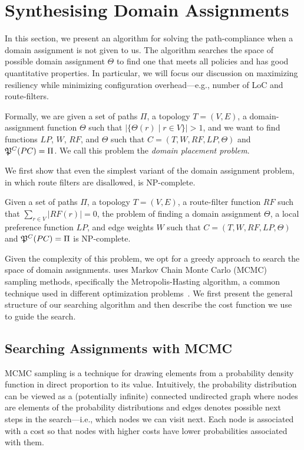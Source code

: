 \section{Synthesising Domain Assignments}
\label{sec:synth-dom-ass}

In this section, we present an algorithm for 
solving the path-compliance when a domain assignment is not given to us.
The algorithm searches the space of possible domain assignment $\Theta$ to find
one that meets all  policies and has good quantitative properties.
In particular, we will focus our discussion on maximizing resiliency while minimizing
configuration overhead---e.g.,  number of LoC and route-filters.

Formally, we are given a set of paths $\Pi$,
a topology $T=(V,E)$,
a domain-assignment function $\Theta$ such that $|\{\Theta(r) \mid r\in V\}|>1$, 
and we want to find functions
$LP$, $W$, $RF$,  and $\Theta$ such that
$C=(T,W,RF,LP,\Theta)$ and
$\mathfrak{P}^C(PC) = \Pi$.
We call this problem the \emph{domain placement problem}.

We first show that even the simplest variant of the domain assignment problem,
in which route filters are disallowed, is NP-complete.
\begin{theorem}
Given a set of paths $\Pi$,
a topology $T=(V,E)$, 
a route-filter function $RF$ such that $\sum_{r\in V} |RF(r)|=0$,
the problem of finding 
a domain assignment $\Theta$, 
a local preference function $LP$,
and edge weights $W$
 such that
$C=(T,W,RF,LP,\Theta)$ and
$\mathfrak{P}^C(PC) = \Pi$  is NP-complete.
\end{theorem}

Given the complexity of this problem, we opt for a greedy approach
to  search the space of domain
assignments. 
\name uses Markov
Chain Monte Carlo (MCMC) sampling methods, specifically the Metropolis-Hasting
algorithm, a common technique used in different optimization 
problems~\cite{stoke}. 
We first present the general structure of our searching algorithm and 
then describe the cost function we use to guide the search.

\subsection{Searching Assignments with MCMC}
MCMC sampling is a technique for 
drawing elements from a
probability density function in direct proportion to its value.
Intuitively, the probability distribution can be viewed as a (potentially infinite) 
connected undirected graph
where nodes are elements of the probability distributions
and edges denotes possible next steps in the search---i.e.,
which nodes we can visit next.
Each node is associated with a cost so that nodes with higher costs have lower
probabilities associated with them.

